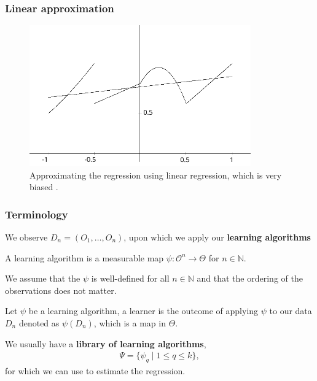 \documentclass{beamer}
\newcommand{\q}{q}
\newcommand{\ml}{k}
\newcommand{\la}{\psi}
\newcommand{\lib}{\Psi}
\begin{document}
\begin{frame}
    \frametitle{Linear approximation}
    \begin{figure}[H]
        \centering
        \includegraphics[width=0.85\textwidth]{figures/linearestimate}
        \caption{Approximating the regression using linear regression, which is very biased \citep{gyorfi2002distribution}.}
    \end{figure}
\end{frame}

\begin{frame}
    \frametitle{Terminology}
    We observe $ D_n = (O_1 , \dots , O_n) $, upon which we apply our \textbf{learning algorithms}  
    \begin{definition}
        A learning algorithm is a measurable map $ \la : \mathcal{O}^{n} \to \Theta $ for $ n \in \mathbb{N} $. 
    \end{definition}
    We assume that the $ \la $ is well-defined for all $ n \in \mathbb{N} $ and that the ordering of the observations does not matter.  
    \begin{definition}
        Let $ \la $ be a learning algorithm, a learner is the outcome of applying $ \la $ to our data $ D_n $ denoted as $ \la(D_n) $, which is a map in $ \Theta $.
    \end{definition}
    We usually have a \textbf{library of learning algorithms}, 
    \begin{align*}
        \lib = \{\la_{\q} \mid 1 \leq \q \leq\ml \},
    \end{align*}
    for which we can use to estimate the regression.  
\end{frame}
\end{document}
